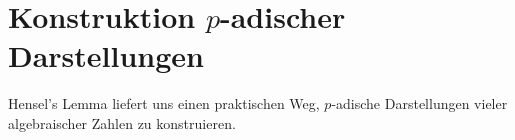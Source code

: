 \documentclass{report}
\newcommand*{\newpar}{\par\vspace{\baselineskip}\noindent}
\begin{document}
	\section{Konstruktion $p$-adischer Darstellungen}
	Hensel's Lemma liefert uns einen praktischen Weg, $p$-adische Darstellungen vieler algebraischer Zahlen zu konstruieren.
	\iffalse
	\begin{application}
		Wir wollen die $2$-adische Darstellung von $-1$ bestimmen. Wir zeigen Induktiv, dass jede Ziffer $1$ ist. Wir betrachten zuerst das Polynom $f(x) = x + 1$. Es gilt $f'(x) = 1 \not\equiv 0 \mod 2$. Es gilt außerdem $f(1) = 2 \equiv 0 \mod 2$. Wähle also $a_0 = 1$.
		\newpar
		Es gilt $f(1) = 2 \overset{!}{\equiv} k \cdot 2 \mod 2^2 \implies k = 1$, also $b_1 \equiv -1 \mod 2 = 1$. Sei nun angenommen, $a_0 = \hdots = a_{n-1} = 1$. Dann gilt:
		\begin{align*}
			f(b_{n-1}2^{n-1} + \hdots + b_1 2 + a_0) = f\left(\sum_{i = 1}^{n-1} 2^i\right) = 2^n - 1 + 1 = 2^n \overset{!}{\equiv} k \cdot 2^{n} \mod 2^{n+1}
		\end{align*}
		also wieder $k = 1$ und $b_n = 1$.
		\newpar
		Die $2$-adische Darstellung von $-1$ ist also $\hdots11111$.
	\end{application}
	\begin{application}
		Bezug zum Zweierkomplement in der Informatik.
	\end{application}
	\begin{proposition}
		In der $p$-adische Darstellung von $-1$ ist jede Ziffer $p-1$. Die $5$-adische Darstellung ist also $\hdots44444$, die $7$-adische Darstellung ist $\hdots66666$, und so weiter.
	\end{proposition}
	\fi
\end{document}
